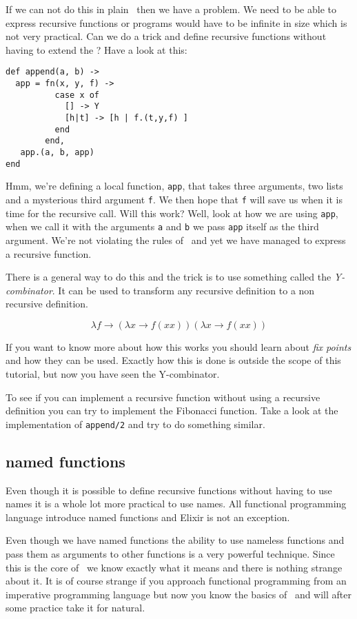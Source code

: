 \documentclass[a4paper,11pt]{article}
\begin{document}
If we can not do this in plain \lamc\ then we have a problem. We need
to be able to express recursive functions or programs would have to be
infinite in size which is not very practical. Can we do a trick and
define recursive functions without having to extend the \lamc? Have a
look at this:

\begin{verbatim}
def append(a, b) ->
  app = fn(x, y, f) -> 
          case x of 
            [] -> Y
            [h|t] -> [h | f.(t,y,f) ]
          end
        end,
   app.(a, b, app)
end
\end{verbatim}

Hmm, we're defining a local function, {\tt app}, that takes three
arguments, two lists and a mysterious third argument {\tt f}. We then
hope that {\tt f} will save us when it is time for the recursive
call. Will this work? Well, look at how we are using {\tt app}, when
we call it with the arguments {\tt a} and {\tt b} we pass {\tt app}
itself as the third argument. We're not violating the rules of \lamc\
and yet we have managed to express a recursive function.

There is a general way to do this and the trick is to use something
called the {\em Y-combinator}. It can be used to transform any
recursive definition to a non recursive definition.

$$\lambda f \rightarrow (\lambda x \rightarrow f(x x)) (\lambda x \rightarrow f (x x))$$

If you want to know more about how this works you should learn about
{\em fix points} and how they can be used. Exactly how this is done is outside
the scope of this tutorial, but now you have seen the Y-combinator.

To see if you can implement a recursive function without using a
recursive definition you can try to implement the Fibonacci
function. Take a look at the implementation of {\tt append/2} and try
to do something similar.

\subsection{named functions}

Even though it is possible to define recursive functions without
having to use names it is a whole lot more practical to use names.
All functional programming language introduce named functions and
Elixir is not an exception.

Even though we have named functions the ability to use nameless
functions and pass them as arguments to other functions is a very
powerful technique. Since this is the core of \lamc\ we know exactly
what it means and there is nothing strange about it. It is of course
strange if you approach functional programming from an imperative
programming language but now you know the basics of \lamc\ and will
after some practice take it for natural.
\end{document}
